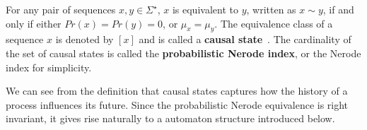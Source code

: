 \begin{defn}
\label{defn:NerodeEquiv}
For any pair of sequences $x, y\in\Sigma^{\star}$, $x$ is equivalent to $y$, written as $x\sim y$, if and only if either $Pr(x) = Pr(y) = 0$, or $\mu_x = \mu_y$. The equivalence class of a sequence $x$ is denoted by $[x]$ and is called a \textbf{causal state}~\cite{Chattopadhyay20140826}. The cardinality of the set of causal states is called the \textbf{probabilistic Nerode index}, or the Nerode index for simplicity.
\end{defn}
We can see from the definition that causal states captures how the history of a process influences its future. Since the probabilistic Nerode equivalence is right invariant, it gives rise naturally to a automaton structure introduced below.

